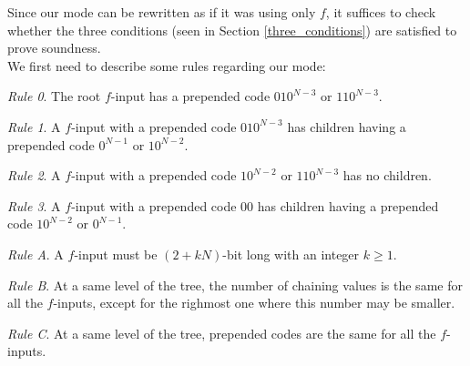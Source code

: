 \documentclass{llncs}
\renewcommand{\paragraph}[1]{\noindent\textit{#1}.}
\begin{document}
Since our mode can be rewritten as if it was using only $f$,
it suffices to check whether the three conditions (seen in Section \ref{three_conditions}) are satisfied to prove soundness.~\\

\noindent
We first need to describe some rules regarding our mode:

\paragraph{Rule 0} The root $f$-input has a prepended code $010^{N-3}$ or $110^{N-3}$. 

\paragraph{Rule 1} A $f$-input with a prepended code $010^{N-3}$ has children having a prepended code $0^{N-1}$ or $10^{N-2}$. 

\paragraph{Rule 2} A $f$-input with a prepended code $10^{N-2}$ or $110^{N-3}$ has no children.

\paragraph{Rule 3} A $f$-input with a prepended code 00 has children having a prepended code $10^{N-2}$ or $0^{N-1}$.

\paragraph{Rule A} A $f$-input must be $(2+kN)$-bit long with an integer $k \geq 1$.

\paragraph{Rule B} At a same level of the tree, the number of chaining values is the same for all the $f$-inputs, except for the righmost one where 
 this number may be smaller.
 
\paragraph{Rule C} At a same level of the tree, prepended codes are the same for all the $f$-inputs.~\\
\end{document}
